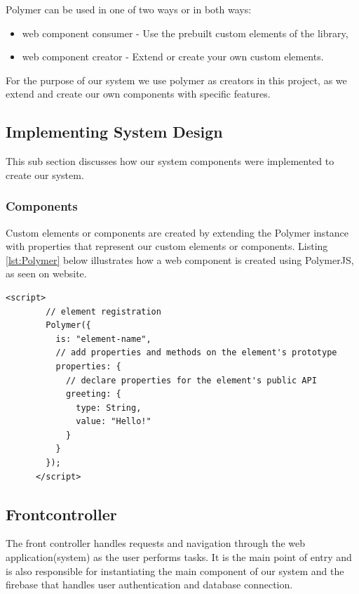 Polymer can be used in one of two ways or in both ways: 
\begin{itemize}
    \item web component consumer - Use the prebuilt custom elements of the library, 
    \item web component creator - Extend or create your own custom elements.
\end{itemize}

For the purpose of our system we use polymer as creators in this project, as we extend and create our own components with specific features.

\subsection{Implementing System Design}
This sub section discusses how our system components were implemented to create our system.
\subsubsection{Components}
Custom elements or components are created by extending the Polymer instance with properties that represent our custom elements or components. Listing \ref{lst:Polymer} below illustrates how a web component is created using PolymerJS, as seen on \cite{website:PolymerJS} website.
\begin{lstlisting}[caption={Creating a web component with PolymerJS}, label={lst:Polymer}]
    <script>
        // element registration
        Polymer({
          is: "element-name",
          // add properties and methods on the element's prototype
          properties: {
            // declare properties for the element's public API
            greeting: {
              type: String,
              value: "Hello!"
            }
          }
        });
      </script>
\end{lstlisting}


\subsection{Frontcontroller}
The front controller handles requests and navigation through the web application(system) as the user performs tasks. It is the main point of entry and is also responsible for instantiating the main component of our system and the firebase \cite{website:Firebase} that handles user authentication and database connection.

